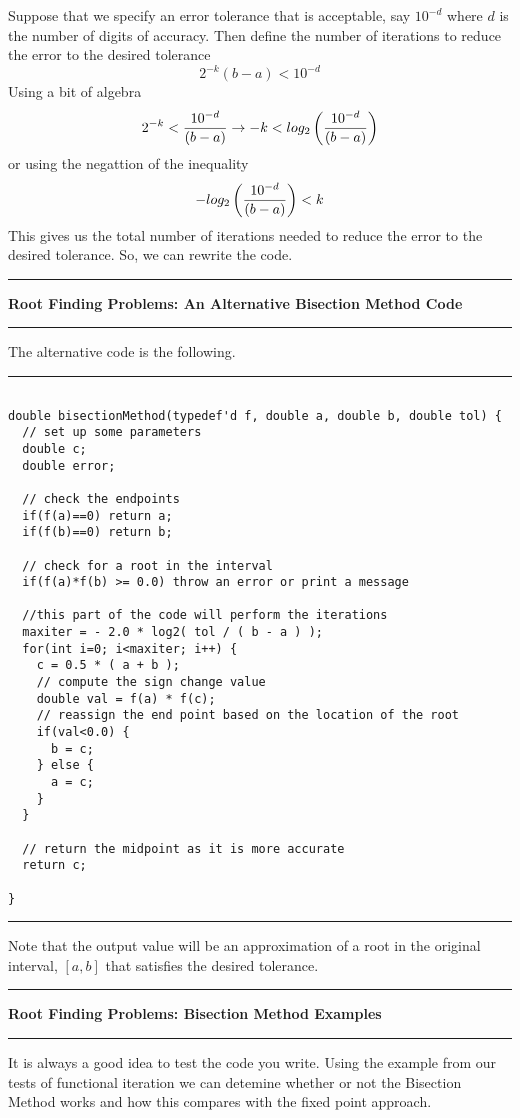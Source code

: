 \documentclass[10pt,fleqn]{article}
\begin{document}
Suppose that we specify an error tolerance that is acceptable, say $10^{-d}$
where $d$ is the number of digits of accuracy. Then define the number of
iterations to reduce the error to the desired tolerance
$$
  2^{-k} ( b - a ) < 10^{-d}
$$
Using a bit of algebra
$$
  2^{-k} < {{10^{-d}}\over{(b-a)}}
   \rightarrow -k < log_2\left( {{10^{-d}}\over{(b-a)}}\right)
$$
or using the negattion of the inequality
$$
  - log_2\left( {{10^{-d}}\over{(b-a)}}\right) < k 
$$
This gives us the total number of iterations needed to reduce the error to the
desired tolerance. So, we can rewrite the code.
\vskip0.1in\hrule\vskip0.1in
\noindent
{\bf Root Finding Problems: An Alternative Bisection Method Code}
\vskip0.1in\hrule\vskip0.1in
\noindent
The alternative code is the following.
\vskip0.1in\hrule\vskip0.1in
\begin{verbatim}

double bisectionMethod(typedef'd f, double a, double b, double tol) {
  // set up some parameters
  double c;
  double error;
 
  // check the endpoints
  if(f(a)==0) return a;
  if(f(b)==0) return b;

  // check for a root in the interval
  if(f(a)*f(b) >= 0.0) throw an error or print a message

  //this part of the code will perform the iterations
  maxiter = - 2.0 * log2( tol / ( b - a ) );
  for(int i=0; i<maxiter; i++) {
    c = 0.5 * ( a + b );
    // compute the sign change value
    double val = f(a) * f(c);
    // reassign the end point based on the location of the root
    if(val<0.0) {
      b = c;
    } else {
      a = c;
    }
  }
  
  // return the midpoint as it is more accurate
  return c;
  
}

\end{verbatim}
\vskip0.1in\hrule\vskip0.1in
\noindent
Note that the output value will be an approximation of a root in the original
interval, $[a,b]$ that satisfies the desired tolerance.
\vskip0.1in\hrule\vskip0.1in
\noindent
{\bf Root Finding Problems: Bisection Method Examples}
\vskip0.1in\hrule\vskip0.1in
\noindent
It is always a good idea to test the code you write. Using the example from our
tests of functional iteration we can detemine whether or not the Bisection 
Method works and how this compares with the fixed point approach.
\end{document}
